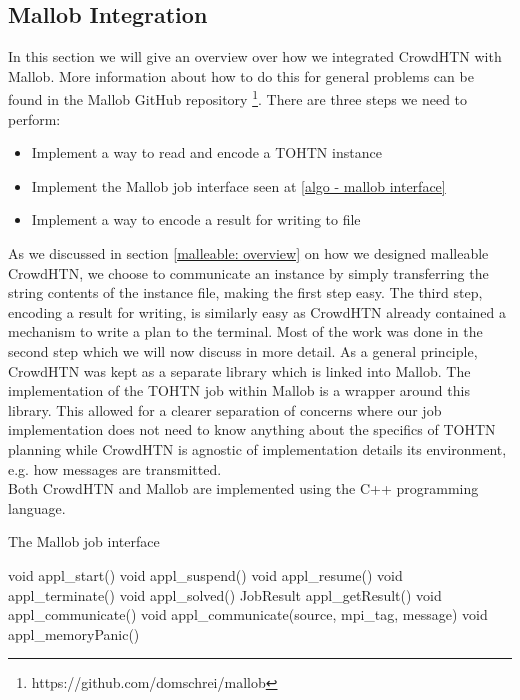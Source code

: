 \subsection{Mallob Integration}
In this section we will give an overview over how we integrated CrowdHTN with Mallob. More information about how to do this for general problems can be found in the Mallob GitHub repository \footnote{https://github.com/domschrei/mallob}. There are three steps we need to perform:
\begin{itemize}
	\item Implement a way to read and encode a TOHTN instance
	\item Implement the Mallob job interface seen at \ref{algo - mallob interface}
	\item Implement a way to encode a result for writing to file
\end{itemize}
As we discussed in section \ref{malleable: overview} on how we designed malleable CrowdHTN, we choose to communicate an instance by simply transferring the string contents of the instance file, making the first step easy. The third step, encoding a result for writing, is similarly easy as CrowdHTN already contained a mechanism to write a plan to the terminal. Most of the work was done in the second step which we will now discuss in more detail. As a general principle, CrowdHTN was kept as a separate library which is linked into Mallob. The implementation of the TOHTN job within Mallob is a wrapper around this library. This allowed for a clearer separation of concerns where our job implementation does not need to know anything about the specifics of TOHTN planning while CrowdHTN is agnostic of implementation details its environment, e.g. how messages are transmitted.\\
Both CrowdHTN and Mallob are implemented using the C++ programming language.
\begin{algorithm}
	\caption{The Mallob job interface}
	\label{algo - mallob interface}
	void appl\_start()\;
	void appl\_suspend()\;
	void appl\_resume()\;
	void appl\_terminate()\;
	void appl\_solved()\;
	JobResult appl\_getResult()\;
	void appl\_communicate()\;
	void appl\_communicate(source, mpi\_tag, message)\;
	void appl\_memoryPanic()\;
\end{algorithm}

